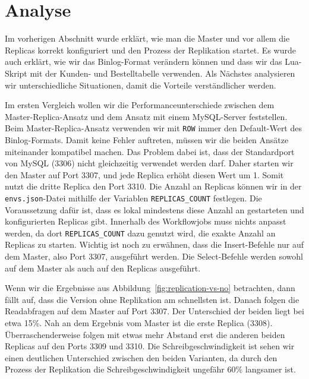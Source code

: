 \section{Analyse}\label{sec:replication-analyse}

Im vorherigen Abschnitt wurde erklärt, wie man die Master und vor allem die Replicas korrekt konfiguriert und den Prozess der Replikation startet.
Es wurde auch erklärt, wie wir das Binlog-Format verändern können und dass wir das Lua-Skript mit der Kunden- und Bestelltabelle verwenden.
Als Nächstes analysieren wir unterschiedliche Situationen, damit die Vorteile verständlicher werden.

Im ersten Vergleich wollen wir die Performanceunterschiede zwischen dem Master-Replica-Ansatz und dem Ansatz mit einem MySQL-Server feststellen.
Beim Master-Replica-Ansatz verwenden wir mit \texttt{ROW} immer den Default-Wert des Binlog-Formats.
Damit keine Fehler auftreten, müssen wir die beiden Ansätze miteinander kompatibel machen.
Das Problem dabei ist, dass der Standardport von MySQL (3306) nicht gleichzeitig verwendet werden darf.
Daher starten wir den Master auf Port 3307, und jede Replica erhöht diesen Wert um 1.
Somit nutzt die dritte Replica den Port 3310.
Die Anzahl an Replicas können wir in der \texttt{envs.json}-Datei mithilfe der Variablen \texttt{REPLICAS\_COUNT} festlegen.
Die Voraussetzung dafür ist, dass es lokal mindestens diese Anzahl an gestarteten und konfigurierten Replicas gibt.
Innerhalb des Workflowjobs muss nichts anpasst werden, da dort \texttt{REPLICAS\_COUNT} dazu genutzt wird, die exakte Anzahl an Replicas zu starten.
Wichtig ist noch zu erwähnen, dass die Insert-Befehle nur auf dem Master, also Port 3307, ausgeführt werden.
Die Select-Befehle werden sowohl auf dem Master als auch auf den Replicas ausgeführt.

Wenn wir die Ergebnisse aus Abbildung~\ref{fig:replication-vs-no} betrachten, dann fällt auf, dass die Version ohne Replikation am schnellsten ist.
Danach folgen die Readabfragen auf dem Master auf Port 3307.
Der Unterschied der beiden liegt bei etwa 15\%.
Nah an dem Ergebnis vom Master ist die erste Replica (3308).
Überraschenderweise folgen mit etwas mehr Abstand erst die anderen beiden Replicas auf den Ports 3309 und 3310.
Die Schreibgeschwindigkeit ist sehen wir einen deutlichen Unterschied zwischen den beiden Varianten, da durch den Prozess der Replikation die Schreibgeschwindigkeit ungefähr 60\% langsamer ist.

